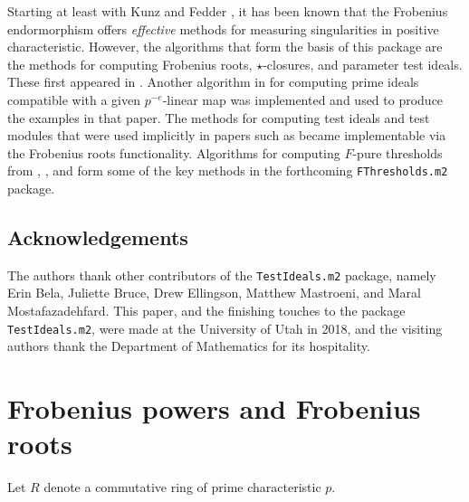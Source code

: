 \documentclass{amsart}
\begin{document}
Starting at least with Kunz \cite{KunzCharacterizationsOfRegularLocalRings} and Fedder \cite{FedderFPureRat}, it has been known that the Frobenius endormorphism offers \emph{effective} methods for measuring singularities in positive characteristic.
However, the algorithms that form the basis of this package are the methods for computing Frobenius roots, $\star$-closures, and parameter test ideals.
These first appeared in \cite{KatzmanParameterTestIdealOfCMRings,BlickleMustataSmithDiscretenessAndRationalityOfFThresholds,BlickleMustataSmithFThresholdsOfHypersurfaces,KatzmanFrobeniusMapsOnInjectiveHulls}.
Another algorithm in \cite{KatzmanSchwedeAlgorithm} for computing prime ideals compatible with a given $p^{-e}$-linear map was implemented and used to produce the examples in that paper.  The methods for computing test ideals and test modules that were used implicitly in papers such as \cite{BlickleSchwedeTakagiZhang,KatzmanLyubeznikZhangOnDiscretenessAndRationality,SchwedeTuckerTestIdealFiniteMaps} became implementable via the Frobenius roots functionality.
Algorithms for computing $F$-pure thresholds from \cite{HernandezFInvariantsOfDiagonalHyp}, \cite{HernandezFPureThresholdOfBinomial}, and \cite{HernandezTeixeiraFThresholdFunctions} form some of the key methods in the forthcoming \texttt{FThresholds.m2} package.

\subsection*{Acknowledgements}
The authors thank other contributors of the \texttt{TestIdeals.m2} package, namely
Erin Bela, Juliette Bruce, Drew Ellingson, Matthew Mastroeni, and Maral Mostafazadehfard.
This paper, and the finishing touches to the package \texttt{TestIdeals.m2}, were made at the University of Utah in 2018, and the visiting authors thank the Department of Mathematics for its hospitality.

\section{Frobenius powers and Frobenius roots}\label{Section: Frobenius powers and Frobenius roots}

Let $R$ denote a commutative ring of prime characteristic $p$.
\end{document}
